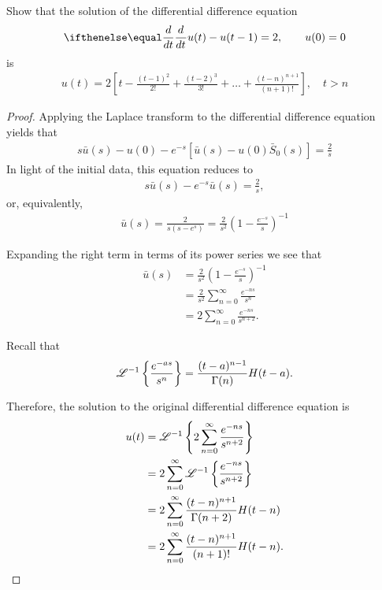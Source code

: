 \begin{problem}{4.37}
  Show that the solution of the differential difference equation
  \begin{align*}
    \der{t}{}u(t) - u(t-1) = 2, \qquad u(0) = 0
  \end{align*}
  is
  \begin{align*}
    u(t) = 2 \left[t - \frac{(t-1)^2}{2!} + \frac{(t-2)^3}{3!} + \dots + \frac{(t-n)^{n+1}}{(n+1)!}\right], \quad t > n
  \end{align*}
\end{problem}

\begin{proof}
  Applying the Laplace transform to the differential difference equation yields
  that
  \begin{align*}
    s\bar{u}(s) - u(0) - e^{-s}\left[\bar{u}(s) - u(0)\bar{S}_0(s)\right] = \frac{2}{s}
  \end{align*}
  In light of the initial data, this equation reduces to
  \begin{align*}
    s\bar{u}(s) - e^{-s}\bar{u}(s) = \frac{2}{s},
  \end{align*}
  or, equivalently,
  \begin{align*}
    \bar{u}(s) = \frac{2}{s(s-e^{s})} = \frac{2}{s^2}\left(1 - \frac{e^{-s}}{s}\right)^{-1}
  \end{align*}

  Expanding the right term in terms of its power series we see that
  \begin{align*}
    \bar{u}(s)
    &= \frac{2}{s^2}\left(1 - \frac{e^{-s}}{s}\right)^{-1}\\
    &= \frac{2}{s^2}\sum_{n=0}^\infty \frac{e^{-ns}}{s^n}\\
    &= 2\sum_{n=0}^\infty \frac{e^{-ns}}{s^{n+2}}.
  \end{align*}

  Recall that
  \begin{align*}
    \mathscr{L}^{-1}\left\{ {\frac{e^{-as}}{s^n}} \right\} = \frac{(t-a)^{n-1}}{\Gamma(n)}H(t-a).
  \end{align*}

  Therefore, the solution to the original differential difference equation is
  \begin{align*}
    u(t) &= \mathscr{L}^{-1}\left\{ {2\sum_{n=0}^\infty \frac{e^{-ns}}{s^{n+2}} } \right\}\\
    &= 2\sum_{n=0}^\infty \mathscr{L}^{-1}\left\{ {\frac{e^{-ns}}{s^{n+2}}} \right\} \\
    &= 2\sum_{n=0}^\infty \frac{(t-n)^{n+1}}{\Gamma(n+2)}H(t-n) \\
    &= 2\sum_{n=0}^\infty \frac{(t-n)^{n+1}}{(n+1)!}H(t-n).
  \end{align*}

\end{proof}
\newpage
